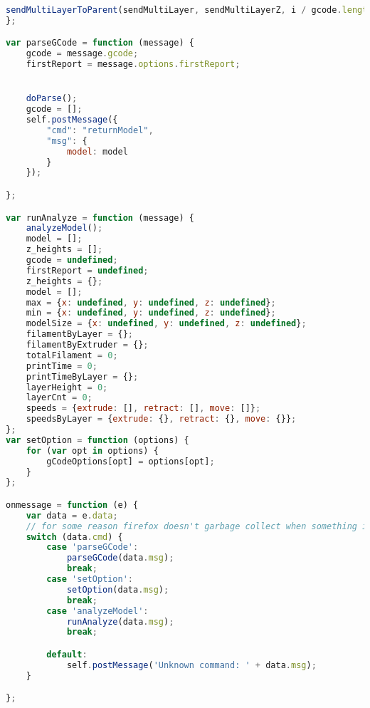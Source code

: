 \begin{lstlisting}[language=JavaScript, label={lst:Worker}, caption=Workerjs is the core gcode to D3 line processor.]
    sendMultiLayerToParent(sendMultiLayer, sendMultiLayerZ, i / gcode.length * 100);
};

var parseGCode = function (message) {
    gcode = message.gcode;
    firstReport = message.options.firstReport;


    doParse();
    gcode = [];
    self.postMessage({
        "cmd": "returnModel",
        "msg": {
            model: model
        }
    });

};

var runAnalyze = function (message) {
    analyzeModel();
    model = [];
    z_heights = [];
    gcode = undefined;
    firstReport = undefined;
    z_heights = {};
    model = [];
    max = {x: undefined, y: undefined, z: undefined};
    min = {x: undefined, y: undefined, z: undefined};
    modelSize = {x: undefined, y: undefined, z: undefined};
    filamentByLayer = {};
    filamentByExtruder = {};
    totalFilament = 0;
    printTime = 0;
    printTimeByLayer = {};
    layerHeight = 0;
    layerCnt = 0;
    speeds = {extrude: [], retract: [], move: []};
    speedsByLayer = {extrude: {}, retract: {}, move: {}};
};
var setOption = function (options) {
    for (var opt in options) {
        gCodeOptions[opt] = options[opt];
    }
};

onmessage = function (e) {
    var data = e.data;
    // for some reason firefox doesn't garbage collect when something inside closures is deleted, so we delete and recreate whole object each time
    switch (data.cmd) {
        case 'parseGCode':
            parseGCode(data.msg);
            break;
        case 'setOption':
            setOption(data.msg);
            break;
        case 'analyzeModel':
            runAnalyze(data.msg);
            break;

        default:
            self.postMessage('Unknown command: ' + data.msg);
    }

};
\end{lstlisting}

